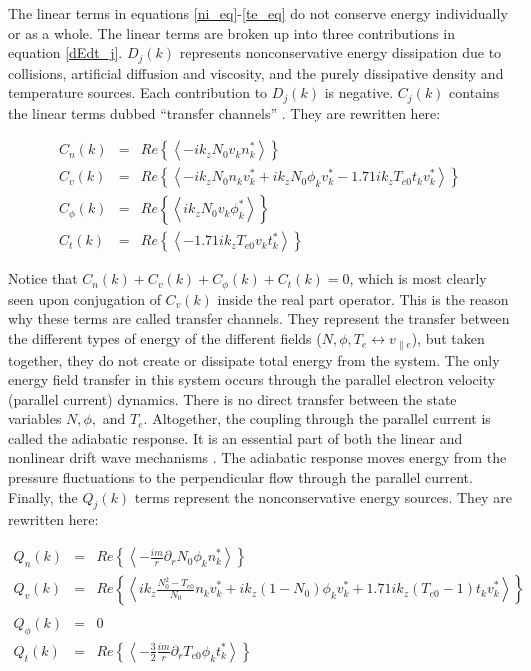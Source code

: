 \documentclass[12pt]{article}
\def\beqar{\begin{eqnarray}}
\def\eeqar{\end{eqnarray}}
\def\para{\parallel}
\newcommand{\pdr}{\partial_r}
\begin{document}
The linear terms in equations \ref{ni_eq}-\ref{te_eq} do not conserve energy individually or as a whole. The linear terms are broken up into three contributions in equation \ref{dEdt_j}.
$D_{j}(k)$ represents nonconservative energy dissipation due to collisions, artificial diffusion and viscosity, and the purely dissipative density and temperature sources.
Each contribution to $D_j(k)$ is negative. $C_j(k)$ contains the linear terms dubbed ``transfer channels'' \cite{scott2002}. They are rewritten here:

\beqar
C_n(k) & = & Re \left\{ \left< - i k_z N_0 v_k n_k^* \right> \right\}
\label{Cnk} \\
C_v(k) & = & Re \left\{ \left<  - i k_z N_0 n_k v_k^* + i k_z N_0 \phi_k v_k^* - 1.71 i k_z T_{e0} t_k v_k^*  \right> \right\}
\label{Cvk} \\
C_\phi(k) & = & Re \left\{ \left< i k_z N_0 v_k \phi_k^* \right> \right\}
\label{Cpk} \\
C_t(k) & = & Re \left\{ \left< - 1.71 i k_z T_{e0} v_k t_k^* \right> \right\}
\label{Ctk}
\eeqar

Notice that $C_n(k) + C_v(k) + C_\phi(k) + C_t(k) = 0$, which is most clearly seen upon conjugation of $C_v(k)$ inside the real part operator.
This is the reason why these terms are called transfer channels. They represent the transfer
between the different types of energy of the different fields ($N,\phi,T_e \leftrightarrow v_{\para e}$), but taken together, they do not create or dissipate total
energy from the system. The only energy field transfer in this system occurs through the parallel electron velocity (parallel current) dynamics. There is no direct transfer between
the state variables $N, \phi,$ and $T_e$.  Altogether, the coupling through the parallel current is called the
adiabatic response. It is an essential part of both the linear and nonlinear
drift wave mechanisms \cite{scott2002,scott2005}. The adiabatic response moves energy from the pressure fluctuations to the perpendicular flow through the parallel current. \\


Finally, the $Q_j(k)$ terms represent the nonconservative energy sources. They are rewritten here:

\beqar
Q_n(k) & = & Re \left\{ \left< -\frac{i m}{r} \pdr N_0 \phi_k n_k^*  \right> \right\}
\label{Qnk} \\
Q_v(k) & = & Re \left\{ \left<  i k_z \frac{N_0^2 - T_{e0}}{N_0} n_k v_k^* + i k_z (1 - N_0) \phi_k v_k^* + 1.71 i k_z (T_{e0} -1) t_k v_k^*  \right> \right\} \\
\label{Qvk} \\
Q_\phi(k) & = & 0
\label{Qpk} \\
Q_t(k) & = & Re \left\{ \left< -\frac{3}{2} \frac{i m}{r} \pdr T_{e0} \phi_k t_k^*  \right> \right\}
\label{Qtk}
\eeqar
\end{document}
